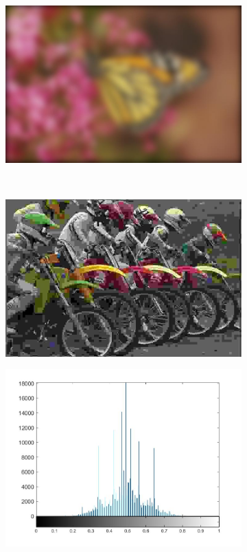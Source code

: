 \begin{figure}
\begin{subfigure}[b]{0.23\textwidth}
         \centering
         \includegraphics[width=\textwidth]{./figs/mblur}
         \caption{}
         \label{fig:nss8}
     \end{subfigure}
     \\
     \begin{subfigure}[b]{0.23\textwidth}
         \centering
         \includegraphics[width=\textwidth]{./figs/jpeg}
         \caption{}
         \label{fig:nss9}
     \end{subfigure}
     \begin{subfigure}[b]{0.23\textwidth}
         \centering
         \includegraphics[width=\textwidth]{./figs/mscn_histjpeg}

\end{subfigure}
\end{figure}
